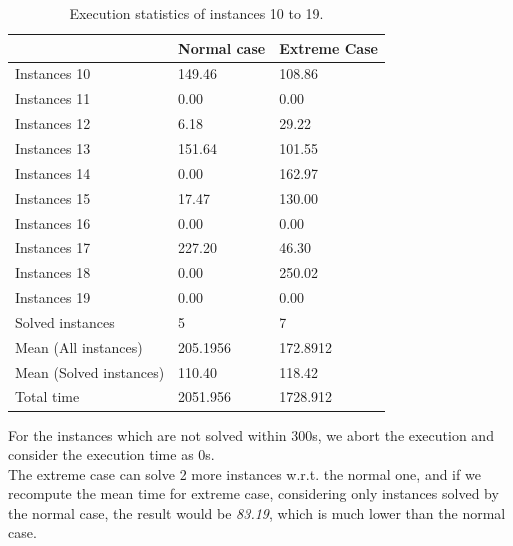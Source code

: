 \begin{table}[!h]
    \centering
    \begin{tabular}{|l|l|l|}
        \hline
         & Normal case & Extreme Case \\ \hline
        Instances 10 & 149.46      & 108.86       \\ \hline
        Instances 11 & 0.00         & 0.00          \\ \hline
        Instances 12 & 6.18        & 29.22        \\ \hline
        Instances 13 & 151.64      & 101.55       \\ \hline
        Instances 14 & 0.00         & 162.97       \\ \hline
        Instances 15 & 17.47       & 130.00       \\ \hline
        Instances 16 & 0.00         & 0.00          \\ \hline
        Instances 17 & 227.20      & 46.30        \\ \hline
        Instances 18 & 0.00         & 250.02       \\ \hline
        Instances 19 & 0.00         & 0.00          \\ \hline
        Solved instances & 5           & 7            \\ \hline
        Mean (All instances) & 205.1956    & 172.8912     \\ \hline
        Mean (Solved instances) & 110.40    & 118.42     \\ \hline
        Total time       & 2051.956    & 1728.912     \\ \hline
    \end{tabular}
    \caption{Execution statistics of instances 10 to 19.}
    \label{tab:my-table}
\end{table}
For the instances which are not solved within 300s, we abort the execution and consider the execution time as 0s. \\
The extreme case can solve 2 more instances w.r.t. the normal one, and if we recompute the mean time for extreme case, considering only instances solved by the normal case, the result would be \emph{83.19}, which is much lower than the normal case. 


